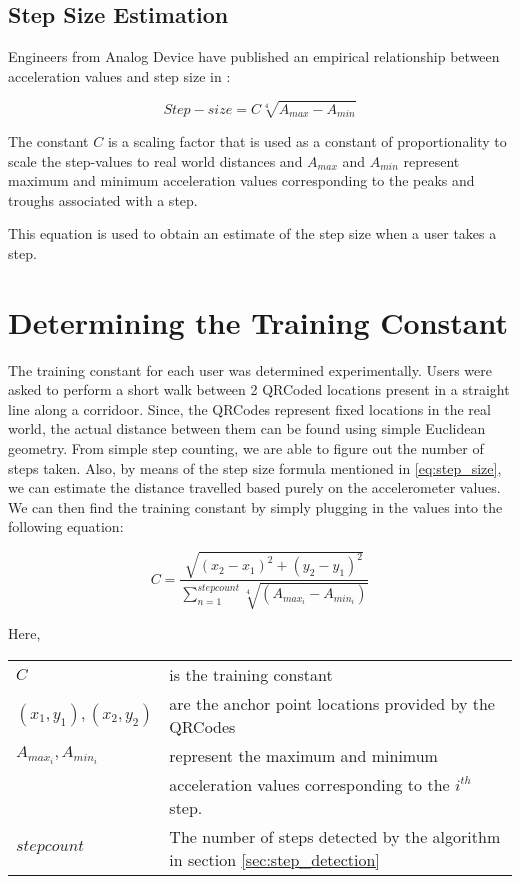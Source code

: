 \subsection{Step Size Estimation}

Engineers from Analog Device have published an empirical relationship between 
acceleration values and step size in \cite{ADXL202}:

\begin{equation}\label{eq:step_size}
 Step-size = C \sqrt[4]{A_{max} - A_{min}}
\end{equation}

The constant $C$ is a scaling factor that is used as a constant of proportionality
to scale the step-values to real world distances and $A_{max}$ and $A_{min}$
represent maximum and minimum acceleration values corresponding to the 
peaks and troughs associated with a step. 

This equation is used to obtain an estimate of the step size when a user 
takes a step.

\section{Determining the Training Constant}

The training constant for each user was determined experimentally. 
Users were asked to perform a short walk between 2 QRCoded locations
present in a straight line along a corridoor.
Since, the QRCodes represent fixed locations in the real world, the actual 
distance between them can be found using simple Euclidean geometry. From 
simple step counting, we are able to figure out the number of steps taken.
Also, by means of the step size formula mentioned in \eqref{eq:step_size},
we can estimate the distance travelled based purely on the accelerometer
values. We can then find the training constant by simply plugging in 
the values into the following equation:

\begin{equation}
C=\frac{\sqrt{(x_{2}-x_{1})^{2}+(y_{2}-y_{1})^{2}}}{\sum_{n=1}^{stepcount}\sqrt[4]{(A_{max_{i}}-A_{min_{i}})}}
\end{equation}

Here,\\
\begin{tabular}{l l}
$C$                         & is the training constant   \\
$(x_1, y_1), (x_2, y_2)$    & are the anchor point locations provided by the QRCodes \\
$A_{max_{i}}, A_{min_{i}}$  & represent the maximum and minimum \\
                            & acceleration values corresponding to the $i^{th}$ step.\\
$stepcount$                 & The number of steps detected by the algorithm in section \ref{sec:step_detection} \\
\end{tabular}


